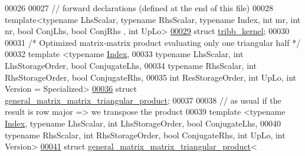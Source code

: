 \begin{DoxyCode}
00026 
00027 \textcolor{comment}{// forward declarations (defined at the end of this file)}
00028 \textcolor{keyword}{template}<\textcolor{keyword}{typename} LhsScalar, \textcolor{keyword}{typename} RhsScalar, \textcolor{keyword}{typename} Index, \textcolor{keywordtype}{int} mr, \textcolor{keywordtype}{int} nr, \textcolor{keywordtype}{bool} ConjLhs, \textcolor{keywordtype}{bool} ConjRhs
      , \textcolor{keywordtype}{int} UpLo>
\hyperlink{struct_eigen_1_1internal_1_1tribb__kernel}{00029} \textcolor{keyword}{struct }\hyperlink{struct_eigen_1_1internal_1_1tribb__kernel}{tribb\_kernel};
00030   
00031 \textcolor{comment}{/* Optimized matrix-matrix product evaluating only one triangular half */}
00032 \textcolor{keyword}{template} <\textcolor{keyword}{typename} \hyperlink{namespace_eigen_a62e77e0933482dafde8fe197d9a2cfde}{Index},
00033           \textcolor{keyword}{typename} LhsScalar, \textcolor{keywordtype}{int} LhsStorageOrder, \textcolor{keywordtype}{bool} ConjugateLhs,
00034           \textcolor{keyword}{typename} RhsScalar, \textcolor{keywordtype}{int} RhsStorageOrder, \textcolor{keywordtype}{bool} ConjugateRhs,
00035                               \textcolor{keywordtype}{int} ResStorageOrder, \textcolor{keywordtype}{int}  UpLo, \textcolor{keywordtype}{int} Version = Specialized>
\hyperlink{struct_eigen_1_1internal_1_1general__matrix__matrix__triangular__product}{00036} \textcolor{keyword}{struct }\hyperlink{struct_eigen_1_1internal_1_1general__matrix__matrix__triangular__product}{general\_matrix\_matrix\_triangular\_product};
00037 
00038 \textcolor{comment}{// as usual if the result is row major => we transpose the product}
00039 \textcolor{keyword}{template} <\textcolor{keyword}{typename} \hyperlink{namespace_eigen_a62e77e0933482dafde8fe197d9a2cfde}{Index}, \textcolor{keyword}{typename} LhsScalar, \textcolor{keywordtype}{int} LhsStorageOrder, \textcolor{keywordtype}{bool} ConjugateLhs,
00040                           \textcolor{keyword}{typename} RhsScalar, \textcolor{keywordtype}{int} RhsStorageOrder, \textcolor{keywordtype}{bool} ConjugateRhs, \textcolor{keywordtype}{int}  UpLo, \textcolor{keywordtype}{int} 
      Version>
\hyperlink{struct_eigen_1_1internal_1_1general__matrix__matrix__triangular__product_3_01_index_00_01_lhs_scd4c70a4453dce53548fa7c3d3f42cf39}{00041} \textcolor{keyword}{struct }\hyperlink{struct_eigen_1_1internal_1_1general__matrix__matrix__triangular__product}{general\_matrix\_matrix\_triangular\_product}<

\end{DoxyCode}

